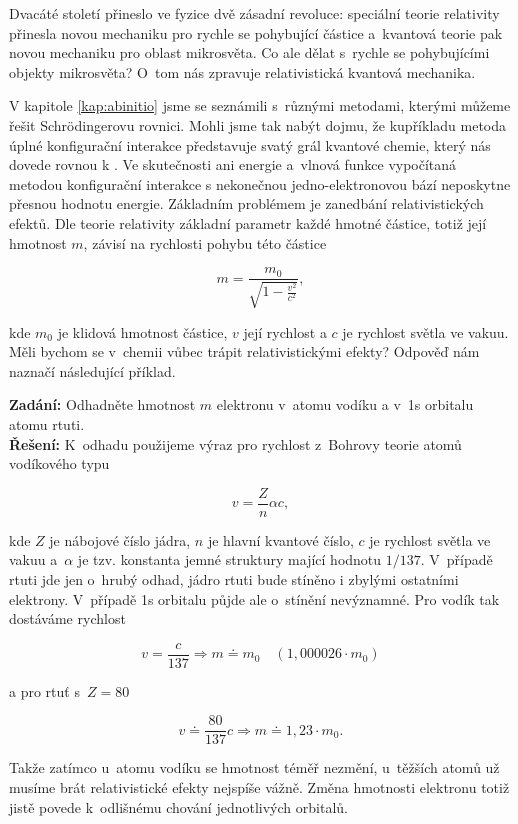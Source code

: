 Dvacáté století přineslo ve fyzice dvě zásadní revoluce: speciální teorie relativity přinesla novou mechaniku pro rychle se pohybující částice a~kvantová teorie pak novou mechaniku pro oblast mikrosvěta. Co ale dělat s~rychle se pohybujícími objekty mikrosvěta? O~tom nás zpravuje relativistická kvantová mechanika. 

V kapitole \ref{kap:abinitio} jsme se seznámili s~různými metodami, kterými můžeme řešit Schr\"odingerovu rovnici. Mohli jsme tak nabýt dojmu, že kupříkladu metoda úplné konfigurační interakce představuje svatý grál kvantové chemie, který nás dovede rovnou k . Ve skutečnosti ani energie a~vlnová funkce vypočítaná metodou konfigurační interakce s nekonečnou jedno-elektronovou bází neposkytne přesnou hodnotu energie. Základním problémem je zanedbání relativistických efektů. Dle teorie relativity základní parametr každé hmotné částice, totiž její hmotnost $m$, závisí na rychlosti pohybu této částice

\begin{equation}
m = \frac{m_0}{\sqrt{1 - \frac{v^2}{c^2}}},
\label{rov:Rel-1}
\end{equation}

\noindent kde $m_0$ je klidová hmotnost částice, $v$ její rychlost a  $c$ je rychlost světla ve vakuu. Měli bychom se v~chemii vůbec trápit relativistickými efekty? Odpověď nám naznačí následující příklad.

\begin{priklad}
\textbf{Zadání:} Odhadněte hmotnost $m$ elektronu v~atomu vodíku a v~1s orbitalu atomu rtuti.\\[0.1cm]
\textbf{Řešení:} K~odhadu použijeme výraz pro rychlost z~Bohrovy teorie atomů vodíkového typu

\begin{displaymath}
v = \frac{Z}{n} \alpha c,
\end{displaymath}

\noindent kde $Z$ je nábojové číslo jádra, $n$ je hlavní kvantové číslo, $c$ je rychlost světla ve vakuu a~$\alpha$ je tzv. konstanta jemné struktury mající hodnotu $1/137$. V~případě rtuti jde jen o~hrubý odhad, jádro rtuti bude stíněno i zbylými ostatními elektrony. V~případě 1s orbitalu půjde ale o~stínění nevýznamné. Pro vodík tak dostáváme rychlost

\begin{displaymath}
v = \frac{c}{137} \Rightarrow m \doteq m_0 \quad (1{,}000026 \cdot m_0)
\end{displaymath}

\noindent a pro rtuť s~$Z=80$

\begin{displaymath}
v \doteq \frac{80}{137} c \Rightarrow m \doteq 1{,}23 \cdot m_0.
\end{displaymath}

\noindent Takže zatímco u~atomu vodíku se hmotnost téměř nezmění, u~těžších atomů už musíme brát relativistické efekty nejspíše vážně. Změna hmotnosti elektronu totiž jistě povede k~odlišnému chování jednotlivých orbitalů.
\end{priklad}

